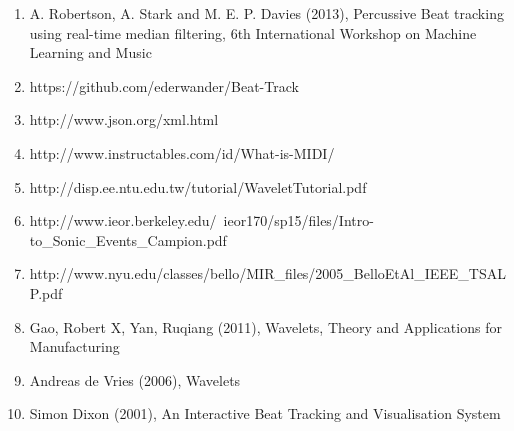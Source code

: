 \documentclass[a4paper, 11pt]{article}
\begin{document}
\begin{enumerate}
\item A. Robertson, A. Stark and M. E. P. Davies (2013), Percussive Beat tracking using real-time median filtering, 6th International Workshop on Machine Learning and Music %
\item https://github.com/ederwander/Beat-Track %
\item http://www.json.org/xml.html %
\item http://www.instructables.com/id/What-is-MIDI/ %
\item http://disp.ee.ntu.edu.tw/tutorial/WaveletTutorial.pdf %
\item http://www.ieor.berkeley.edu/~ieor170/sp15/files/Intro-to\_Sonic\_Events\_Campion.pdf %
\item http://www.nyu.edu/classes/bello/MIR\_files/2005\_BelloEtAl\_IEEE\_TSALP.pdf %
\item Gao, Robert X, Yan, Ruqiang (2011), Wavelets, Theory and Applications for Manufacturing %
\item Andreas de Vries (2006), Wavelets %
\item Simon Dixon (2001), An Interactive Beat Tracking and Visualisation System
\end{enumerate}
\end{document}
